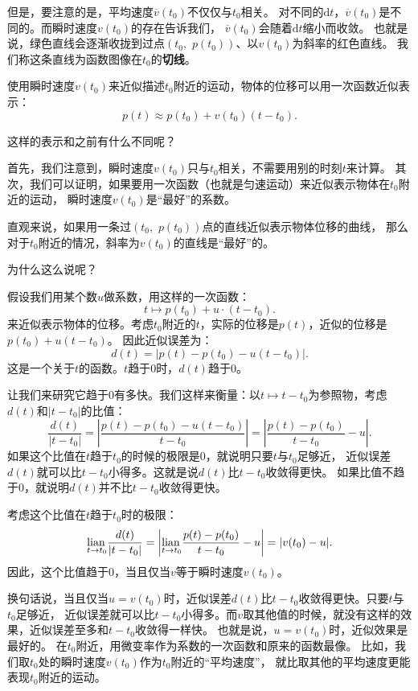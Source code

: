 \documentclass[12pt,UTF8,fontset=none]{ctexbook}
\begin{document}
但是，要注意的是，平均速度$\overline{v}(t_0)$不仅仅与$t_0$相关。
对不同的$\mathrm{d}t$，$\overline{v}(t_0)$是不同的。而瞬时速度$v(t_0)$的存在告诉我们，
$\overline{v}(t_0)$会随着$\mathrm{d}t$缩小而收敛。
也就是说，绿色直线会逐渐收拢到过点$(t_0, \,\,p(t_0))$、以$v(t_0)$为斜率的红色直线。
我们称这条直线为函数图像在$t_0$的\textbf{切线}。

使用瞬时速度$v(t_0)$来近似描述$t_0$附近的运动，物体的位移可以用一次函数近似表示：
$$ p(t) \approx p(t_0) + v(t_0)(t - t_0).$$

这样的表示和之前有什么不同呢？

首先，我们注意到，瞬时速度$v(t_0)$只与$t_0$相关，不需要用别的时刻$t$来计算。
其次，我们可以证明，如果要用一次函数（也就是匀速运动）来近似表示物体在$t_0$附近的运动，
瞬时速度$v(t_0)$是“最好”的系数。

直观来说，如果用一条过$(t_0, \,\,p(t_0))$点的直线近似表示物体位移的曲线，
那么对于$t_0$附近的情况，斜率为$v(t_0)$的直线是“最好”的。

为什么这么说呢？

假设我们用某个数$u$做系数，用这样的一次函数：
$$ t \mapsto p(t_0) + u\cdot (t - t_0).$$
来近似表示物体的位移。考虑$t_0$附近的$t$，实际的位移是$p(t)$，近似的位移是$p(t_0) + u(t - t_0)$。
因此近似误差为：
$$ d(t) = \left|p(t) - p(t_0) - u(t - t_0)\right|. $$
这是一个关于$t$的函数。$t$趋于$0$时，$d(t)$趋于$0$。

让我们来研究它趋于$0$有多快。我们这样来衡量：以$t\mapsto t - t_0$为参照物，考虑$d(t)$和$|t - t_0|$的比值：
$$ \frac{d(t)}{|t - t_0|} = \left|\frac{p(t) - p(t_0) - u(t - t_0)}{t -  t_0}\right| =  \left|\frac{p(t) - p(t_0)}{t -  t_0} - u\right|. $$
如果这个比值在$t$趋于$t_0$的时候的极限是$0$，就说明只要$t$与$t_0$足够近，
近似误差$d(t)$就可以比$t-t_0$小得多。这就是说$d(t)$比$t-t_0$收敛得更快。
如果比值不趋于$0$，就说明$d(t)$并不比$t-t_0$收敛得更快。

考虑这个比值在$t$趋于$t_0$时的极限：
$$ \underset{t\to t_0}{\operatorname{lian}\,} \frac{d(t)}{|t - t_0|} = \left|\underset{t\to t_0}{\operatorname{lian}\,} \frac{p(t) - p(t_0)}{t -  t_0} - u\right| = |v(t_0) - u|. $$
因此，这个比值趋于$0$，当且仅当$v$等于瞬时速度$v(t_0)$。

换句话说，当且仅当$u = v(t_0)$时，近似误差$d(t)$比$t-t_0$收敛得更快。只要$t$与$t_0$足够近，
近似误差就可以比$t-t_0$小得多。而$v$取其他值的时候，就没有这样的效果，近似误差至多和$t-t_0$收敛得一样快。
也就是说，$u = v(t_0)$时，近似效果是最好的。
在$t_0$附近，用微变率作为系数的一次函数和原来的函数最像。
比如，我们取$t_0$处的瞬时速度$v(t_0)$作为$t_0$附近的“平均速度”，
就比取其他的平均速度更能表现$t_0$附近的运动。
\end{document}
